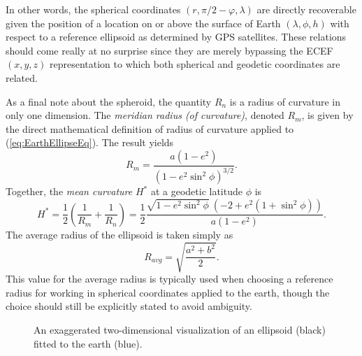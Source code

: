 \documentclass[11pt,dvipsnames]{thesis}
\begin{document}
In other words, the spherical coordinates $(r, \pi/2 - \varphi, \lambda)$ are directly recoverable given the position of a location on or above the surface of Earth $(\lambda, \phi, h)$ with respect to a reference ellipsoid as determined by GPS satellites. These relations should come really at no surprise since they are merely bypassing the ECEF $(x, y, z)$ representation to which both spherical and geodetic coordinates are related.

As a final note about the spheroid, the quantity $R_n$ is a radius of curvature in only one dimension. The \textit{meridian radius (of curvature)}, denoted $R_m$, is given by the direct mathematical definition of radius of curvature applied to (\ref{eq:EarthEllipseEq}). The result yields
\begin{equation}
R_m = \frac{a (1-e^2)}{(1 - e^2 \sin^2\phi)^{3/2}}.
\end{equation}
Together, 
the \textit{mean curvature} $H^*$ at a geodetic latitude $\phi$ is
\begin{equation}
H^* = \frac{1}{2} \left(\frac{1}{R_m} + \frac{1}{R_n}\right) = \frac{1}{2} \frac{\sqrt{1 - e^2 \sin^2\phi}\ (-2 + e^2 (1 + \sin^2\phi))}{a (1-e^2)}. \label{eq:SpheroidMeanCurvature}
\end{equation}
The average radius of the ellipsoid is taken simply as
\begin{equation} 
R_{avg} = \sqrt{\frac{a^2 + b^2}{2}}. \label{eq:AverageEllipsoidRadius}
\end{equation}
This value for the average radius is typically used when choosing a reference radius for working in spherical coordinates applied to the earth, though the choice should still be explicitly stated to avoid ambiguity.

\begin{figure}[H]
\centering
{}
\caption{An exaggerated two-dimensional visualization of an ellipsoid (black) fitted to the earth (blue).}
\end{figure}
\end{document}
